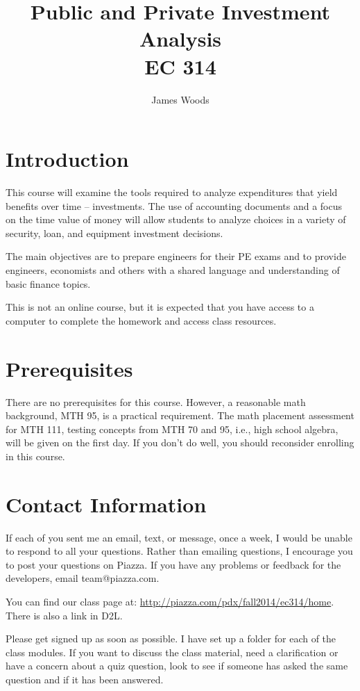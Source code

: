\documentclass[letterpaper,10pt]{article}
\date{}
\title{Public and Private Investment Analysis\\ 
EC 314\\
\Term}
\author{James Woods}
\newcommand{\Piazza}{\url{http://piazza.com/pdx/fall2014/ec314/home}}
\begin{document}
  
\maketitle

\section{Introduction}

This course will examine the tools required to analyze expenditures
that yield benefits over time -- investments. The use of accounting
documents and a focus on the time value of money will allow students
to analyze choices in a variety of security, loan, and equipment
investment decisions.

The main objectives are to prepare engineers for their PE exams and to
provide engineers, economists and others with a shared language and
understanding of basic finance topics.

This is not an online course, but it is expected that you have access to a
computer to complete the homework and access class resources.  



\section{Prerequisites}

There are no prerequisites for this course. However, a reasonable math
background, MTH 95, is a practical requirement. The math placement assessment for MTH 111, testing concepts from MTH 70 and 95, i.e., high school algebra, will be given on the first day.  If you don't do well, you
should reconsider enrolling in this course.

\section{Contact Information}

If each of you sent me an email, text, or message, once a week, I would be unable to respond to all your questions.  Rather than emailing questions, I encourage you to post your questions on Piazza. If you have any problems or feedback for the developers, email team@piazza.com.

You can find our class page at: \Piazza.  There is also a link in D2L.

Please get signed up as soon as possible. I have set up a
folder for each of the class modules. If you want to discuss the class material, need a clarification or have a concern about a quiz question, look to see if someone has asked the same question and if it has been answered. 
\end{document}
